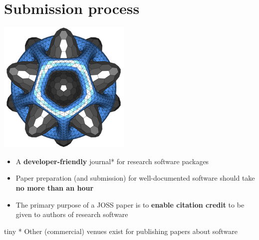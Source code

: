 \section{Submission process}

\begin{frame}
  \includegraphics[scale=0.5]{joss.png}      
\vspace{1cm}
\begin{itemize}
    \item A \textbf{developer-friendly} journal* for research software
packages
    \item Paper preparation (and submission) for well-documented
software should take \textbf{no more than an hour}
\item The primary purpose of a JOSS paper is to \textbf{enable citation
credit} to be given to authors of research software
\end{itemize}

\vspace{2cm}

{tiny * Other (commercial) venues exist for publishing papers about software}
\end{frame}

